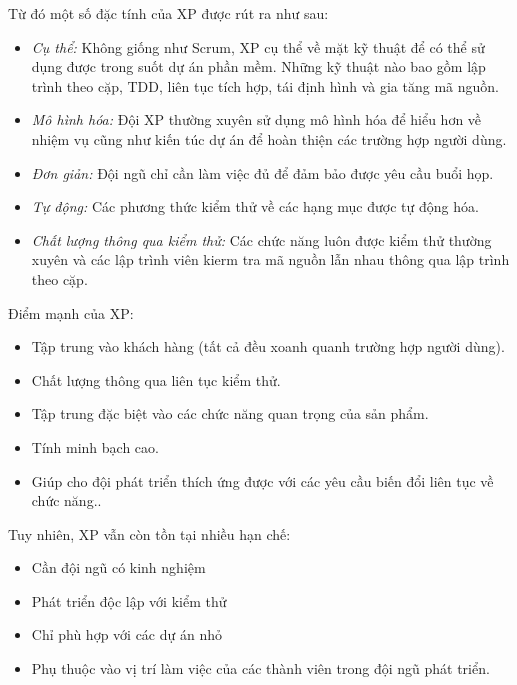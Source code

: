 \documentclass{article}
\begin{document}
	Từ đó một số đặc tính của XP được rút ra như sau:
	
	\begin{itemize}
		\item \textit{Cụ thể:} Không giống như Scrum, XP cụ thể về mặt kỹ thuật để có thể sử dụng được trong suốt dự án phần mềm. Những kỹ thuật nào bao gồm lập trình theo cặp, TDD, liên tục tích hợp, tái định hình và gia tăng mã nguồn.
		
		\item \textit{Mô hình hóa:} Đội XP thường xuyên sử dụng mô hình hóa để hiểu hơn về nhiệm vụ cũng như kiến túc dự án để hoàn thiện các trường hợp người dùng.
		
		\item \textit{Đơn giản:} Đội ngũ chỉ cần làm việc đủ để đảm bảo được yêu cầu buổi họp.
		\item \textit{Tự động:} Các phương thức kiểm thử về các hạng mục được tự động hóa.
		
		\item \textit{Chất lượng thông qua kiểm thử:} Các chức năng luôn được kiểm thử thường xuyên và các lập trình viên kierm tra mã nguồn lẫn nhau thông qua lập trình theo cặp.
		\end{itemize}
	
	Điểm mạnh của XP:
	\begin{itemize}
		\item Tập trung vào khách hàng (tất cả đều xoanh quanh trường hợp người dùng).
		\item Chất lượng thông qua liên tục kiểm thử.
		\item Tập trung đặc biệt vào các chức năng quan trọng của sản phẩm.
		\item Tính minh bạch cao.
		\item Giúp cho đội phát triển thích ứng được với các yêu cầu biến đổi liên tục về chức năng..
		\end{itemize}
		
	Tuy nhiên, XP vẫn còn tồn tại nhiều hạn chế:
	\begin{itemize}
		
		\item  Cần đội ngũ có kinh nghiệm
		\item Phát triển độc lập với kiểm thử
		\item Chỉ phù hợp với các dự án nhỏ
		\item Phụ thuộc vào vị trí làm việc của các thành viên trong đội ngũ phát triển.
		\end{itemize}
		
\end{document}

